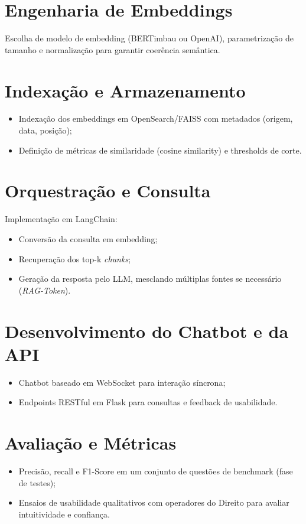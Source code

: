 \section{Engenharia de Embeddings}
Escolha de modelo de embedding (BERTimbau ou OpenAI), parametrização de tamanho e normalização para garantir coerência semântica.

\section{Indexação e Armazenamento}
\begin{itemize}[label=\textbullet]
  \item Indexação dos embeddings em OpenSearch/FAISS com metadados (origem, data, posição);
  \item Definição de métricas de similaridade (cosine similarity) e thresholds de corte.
\end{itemize}

\section{Orquestração e Consulta}
Implementação em LangChain:
\begin{itemize}[label=\textbullet]
  \item Conversão da consulta em embedding;
  \item Recuperação dos top-k \emph{chunks};
  \item Geração da resposta pelo LLM, mesclando múltiplas fontes se necessário (\emph{RAG-Token}).
\end{itemize}

\section{Desenvolvimento do Chatbot e da API}
\begin{itemize}[label=\textbullet]
  \item Chatbot baseado em WebSocket para interação síncrona;
  \item Endpoints RESTful em Flask para consultas e feedback de usabilidade.
\end{itemize}

\section{Avaliação e Métricas}
\begin{itemize}[label=\textbullet]
  \item Precisão, recall e F1-Score em um conjunto de questões de benchmark (fase de testes);
  \item Ensaios de usabilidade qualitativos com operadores do Direito para avaliar intuitividade e confiança.
\end{itemize}

